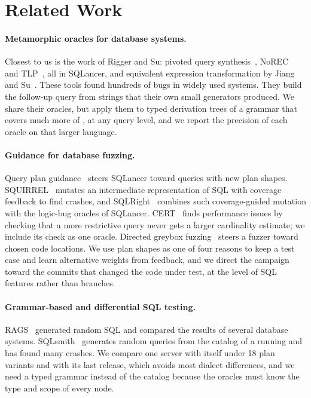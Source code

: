 \section{Related Work}
\label{sec:related}

\paragraph{Metamorphic oracles for database systems.} Closest to us is the
work of Rigger and Su: pivoted query synthesis~\cite{rigger2020pqs},
NoREC~\cite{rigger2020norec} and TLP~\cite{rigger2020tlp}, all in SQLancer,
and equivalent expression transformation by Jiang and
Su~\cite{jiang2024eet}. These tools found hundreds of bugs in widely used
systems. They build the follow-up query from strings that their own small
generators produced. We share their oracles, but apply them to typed
derivation trees of a grammar that covers much more of \pg, at any query
level, and we report the precision of each oracle on that larger language.

\paragraph{Guidance for database fuzzing.} Query plan
guidance~\cite{ba2023qpg} steers SQLancer toward queries with new plan shapes.
SQUIRREL~\cite{zhong2020squirrel} mutates an intermediate representation of
SQL with coverage feedback to find crashes, and SQLRight~\cite{liang2022sqlright}
combines such coverage-guided mutation with the logic-bug oracles of SQLancer.
CERT~\cite{ba2024cert} finds performance issues by checking that a more
restrictive query never gets a larger cardinality estimate; we include its
check as one oracle. Directed greybox fuzzing~\cite{bohme2017aflgo} steers a
fuzzer toward chosen code locations. We use plan shapes as one of four reasons
to keep a test case and learn alternative weights from feedback, and we direct
the campaign toward the commits that changed the code under test, at the level
of SQL features rather than branches.

\paragraph{Grammar-based and differential SQL testing.} RAGS~\cite{slutz1998rags}
generated random SQL and compared the results of several database systems.
SQLsmith~\cite{sqlsmith} generates random queries from the catalog of a
running \pg and has found many crashes. We compare one server with itself
under 18 plan variants and with its last release, which avoids most dialect
differences, and we need a typed grammar instead of the catalog because the
oracles must know the type and scope of every node.

